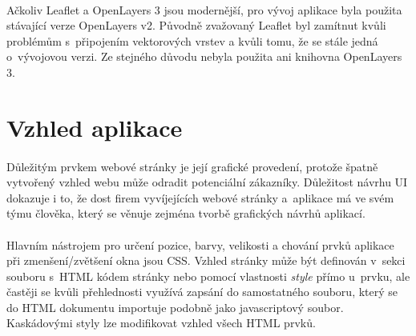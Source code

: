 \documentclass[11pt,a4paper,titlepage,oneside]{book}
\begin{document}
		\paragraph{} Ačkoliv Leaflet a OpenLayers 3 jsou modernější, pro vývoj aplikace byla použita stávající verze OpenLayers v2. Původně zvažovaný Leaflet byl zamít\-nut kvůli problémům s~připojením vektorových vrstev a kvůli tomu, že se stále jedná o~vývojovou verzi. Ze stejného důvodu nebyla použita ani knihovna OpenLayers 3.



	\section{Vzhled aplikace}




		\paragraph{} Důležitým prvkem webové stránky je její grafické provedení, protože špatně vytvořený vzhled webu může odradit potenciální zákazníky. Důležitost návrhu \ac{UI} dokazuje i to, že dost firem vyvíjejících webové stránky a~aplikace má ve svém týmu člověka, který se věnuje zejména tvorbě grafických návrhů aplikací.


		\paragraph{} Hlavním nástrojem pro určení pozice, barvy, velikosti a chování prvků aplikace při zmenšení/zvětšení okna jsou \ac{CSS}. Vzhled stránky může být definován v~sekci  souboru s~HTML kódem stránky nebo pomocí vlastnosti \textit{style} přímo u~prvku, ale častěji se kvůli přehlednosti využívá zapsání do samostatného souboru, který se do HTML dokumentu importuje podobně jako javascriptový soubor. Kaskádovými styly lze modifikovat vzhled všech HTML prvků. 

\end{document}
